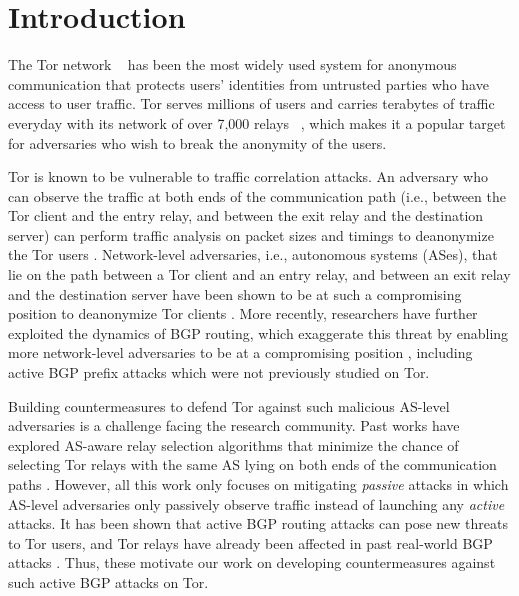 \section{Introduction}

The Tor network ~\cite{dingledine2004tor} has been the most widely used system for anonymous communication that protects users' identities from untrusted parties who have access to user traffic. Tor serves millions of users and carries terabytes of traffic everyday with its network of over 7,000 relays ~\cite{tormetrics}, which makes it a popular target for adversaries who wish to break the anonymity of the users. 

Tor is known to be vulnerable to traffic correlation attacks. An adversary who can observe the traffic at both ends of the communication path (i.e., between the Tor client and the entry relay, and between the exit relay and the destination server) can perform traffic analysis on packet sizes and timings to deanonymize the Tor users \cite{shmatikov2006timing, syverson2001towards}. Network-level adversaries, i.e., autonomous systems (ASes), that lie on the path between a Tor client and an entry relay, and between an exit relay and the destination server have been shown to be at such a compromising position to deanonymize Tor clients \cite{edman2009awareness, feamster2004location, johnson2013users}. More recently, researchers have further exploited the dynamics of BGP routing, which exaggerate this threat by enabling more network-level adversaries to be at a compromising position \cite{sun2015raptor}, including active BGP prefix attacks which were not previously studied on Tor. 

Building countermeasures to defend Tor against such malicious AS-level adversaries is a challenge facing the research community. Past works have explored AS-aware relay selection algorithms that minimize the chance of selecting Tor relays with the same AS lying on both ends of the communication paths \cite{akhoondi2012lastor, edman2009awareness, starov2015measuring}. However, all this work only focuses on mitigating \emph{passive} attacks in which AS-level adversaries only passively observe traffic instead of launching any \emph{active} attacks. It has been shown that active BGP routing attacks can pose new threats to Tor users, and Tor relays have already been affected in past real-world BGP attacks \cite{sun2015raptor}. Thus, these motivate our work on developing countermeasures against such active BGP attacks on Tor. 

